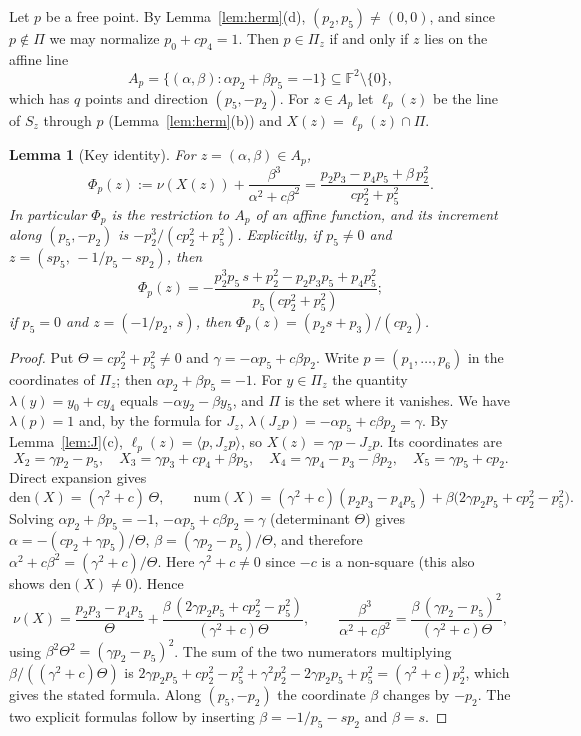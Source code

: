 \documentclass[11pt]{amsart}
\newtheorem{lemma}[theorem]{Lemma}
\theoremstyle{definition}
\theoremstyle{remark}
\newcommand{\F}{\mathbb{F}}
\begin{document}
Let $p$ be a free point. By Lemma~\ref{lem:herm}(d), $(p_2,p_5)\ne(0,0)$, and since $p\notin\Pi$ we may normalize $p_0+cp_4=1$. Then $p\in\Pi_z$ if and only if $z$ lies on the affine line
\[
A_p=\{(\alpha,\beta):\alpha p_2+\beta p_5=-1\}\subseteq\F^2\setminus\{0\},
\]
which has $q$ points and direction $(p_5,-p_2)$. For $z\in A_p$ let $\ell_p(z)$ be the line of $S_z$ through $p$ (Lemma~\ref{lem:herm}(b)) and $X(z)=\ell_p(z)\cap\Pi$.

\begin{lemma}[Key identity]\label{lem:key}
For $z=(\alpha,\beta)\in A_p$,
\[
\Phi_p(z):=\nu(X(z))+\frac{\beta^3}{\alpha^2+c\beta^2}=\frac{p_2p_3-p_4p_5+\beta\,p_2^2}{cp_2^2+p_5^2}.
\]
In particular $\Phi_p$ is the restriction to $A_p$ of an affine function, and its increment along $(p_5,-p_2)$ is $-p_2^3/(cp_2^2+p_5^2)$. Explicitly, if $p_5\ne0$ and $z=(sp_5,\,-1/p_5-sp_2)$, then
\[
\Phi_p(z)=-\frac{p_2^3p_5\,s+p_2^2-p_2p_3p_5+p_4p_5^2}{p_5(cp_2^2+p_5^2)};
\]
if $p_5=0$ and $z=(-1/p_2,\,s)$, then $\Phi_p(z)=(p_2s+p_3)/(cp_2)$.
\end{lemma}

\begin{proof}
Put $\Theta=cp_2^2+p_5^2\ne0$ and $\gamma=-\alpha p_5+c\beta p_2$. Write $p=(p_1,\dots,p_6)$ in the coordinates of $\Pi_z$; then $\alpha p_2+\beta p_5=-1$. For $y\in\Pi_z$ the quantity $\lambda(y)=y_0+cy_4$ equals $-\alpha y_2-\beta y_5$, and $\Pi$ is the set where it vanishes. We have $\lambda(p)=1$ and, by the formula for $J_z$, $\lambda(J_zp)=-\alpha p_5+c\beta p_2=\gamma$. By Lemma~\ref{lem:J}(c), $\ell_p(z)=\langle p,J_zp\rangle$, so $X(z)=\gamma p-J_zp$. Its coordinates are
\[
X_2=\gamma p_2-p_5,\quad X_3=\gamma p_3+cp_4+\beta p_5,\quad X_4=\gamma p_4-p_3-\beta p_2,\quad X_5=\gamma p_5+cp_2 .
\]
Direct expansion gives
\[
\mathrm{den}(X)=(\gamma^2+c)\,\Theta,\qquad \mathrm{num}(X)=(\gamma^2+c)(p_2p_3-p_4p_5)+\beta\bigl(2\gamma p_2p_5+cp_2^2-p_5^2\bigr).
\]
Solving $\alpha p_2+\beta p_5=-1$, $-\alpha p_5+c\beta p_2=\gamma$ (determinant $\Theta$) gives $\alpha=-(cp_2+\gamma p_5)/\Theta$, $\beta=(\gamma p_2-p_5)/\Theta$, and therefore $\alpha^2+c\beta^2=(\gamma^2+c)/\Theta$. Here $\gamma^2+c\ne0$ since $-c$ is a non-square (this also shows $\mathrm{den}(X)\ne0$). Hence
\[
\nu(X)=\frac{p_2p_3-p_4p_5}{\Theta}+\frac{\beta\,(2\gamma p_2p_5+cp_2^2-p_5^2)}{(\gamma^2+c)\Theta},\qquad
\frac{\beta^3}{\alpha^2+c\beta^2}=\frac{\beta\,(\gamma p_2-p_5)^2}{(\gamma^2+c)\Theta},
\]
using $\beta^2\Theta^2=(\gamma p_2-p_5)^2$. The sum of the two numerators multiplying $\beta/((\gamma^2+c)\Theta)$ is $2\gamma p_2p_5+cp_2^2-p_5^2+\gamma^2p_2^2-2\gamma p_2p_5+p_5^2=(\gamma^2+c)p_2^2$, which gives the stated formula. Along $(p_5,-p_2)$ the coordinate $\beta$ changes by $-p_2$. The two explicit formulas follow by inserting $\beta=-1/p_5-sp_2$ and $\beta=s$.
\end{proof}
\end{document}
